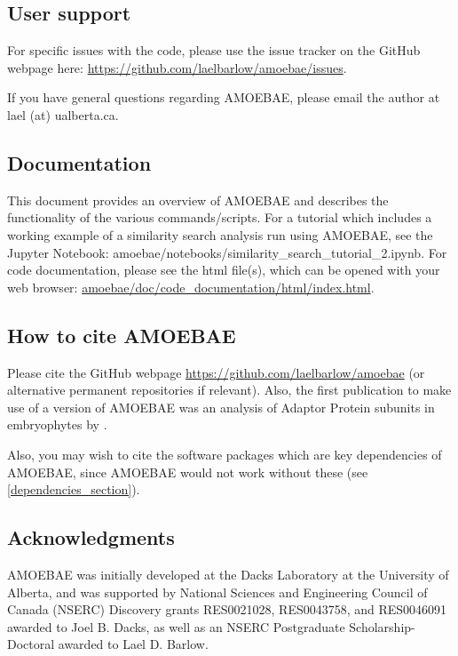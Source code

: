 \documentclass[12pt,letterpaper]{article}
\begin{document}
\begin{linenumbers}
\subsection{User support}

For specific issues with the code, please use the issue tracker on the GitHub
    webpage here: \url{https://github.com/laelbarlow/amoebae/issues}. 

If you have general questions regarding AMOEBAE, please email the author at
    lael (at) ualberta.ca.

\subsection{Documentation}

This document provides an overview of AMOEBAE and describes the functionality
of the various commands/scripts. For a tutorial which includes a working
example of a similarity search analysis run using AMOEBAE, see the Jupyter
Notebook: amoebae/notebooks/similarity\_search\_tutorial\_2.ipynb. For code
documentation, please see the html file(s), which can be opened with your web
browser: \url{amoebae/doc/code_documentation/html/index.html}.


\subsection{How to cite AMOEBAE}

Please cite the GitHub webpage \url{https://github.com/laelbarlow/amoebae} (or
alternative permanent repositories if relevant). Also, the first publication to
make use of a version of AMOEBAE was an analysis of Adaptor Protein subunits in
embryophytes by \cite{larson2019}.

Also, you may wish to cite the software packages which are key dependencies of
AMOEBAE, since AMOEBAE would not work without these (see
\autoref*{dependencies_section}).

\subsection{Acknowledgments}

AMOEBAE was initially developed at the Dacks Laboratory at the University of
Alberta, and was supported by National Sciences and Engineering Council of
Canada (NSERC) Discovery grants RES0021028, RES0043758, and RES0046091 awarded
to Joel B. Dacks, as well as an NSERC Postgraduate Scholarship-Doctoral awarded
to Lael D. Barlow.


\end{linenumbers}
\end{document}
